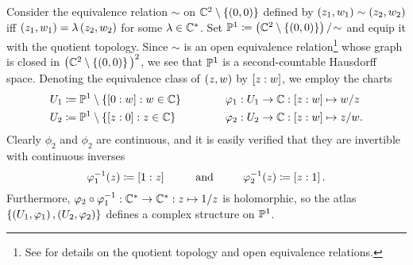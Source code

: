 \documentclass[../Moduli_Spaces_of_Riemann_Surfaces.tex]{subfiles}
\begin{document}
    \begin{example}\label{RS:exa:complex_projective_line}
        Consider the equivalence relation $\sim$ on $\C^2\comp\l\{\tpl{0,0}\r\}$ defined by $\tpl{z_1,w_1}\sim\tpl{z_2,w_2}$ iff $\tpl{z_1,w_1}=\lambda\tpl{z_2,w_2}$ for some $\lambda\in\C^\ast$. Set $\P^1\coloneqq\l(\C^2\comp\l\{\tpl{0,0}\r\}\r)/\!\sim$ and equip it with the quotient topology. Since $\sim$ is an open equivalence relation\footnote{See \cite[][Section 7.5]{tu} for details on the quotient topology and open equivalence relations.} whose graph is closed in $\big(\C^2\comp\l\{\tpl{0,0}\r\}\big)^2$, we see that $\P^1$ is a second-countable Hausdorff space. Denoting the equivalence class of $\tpl{z,w}$ by $\proje{z:w}$, we employ the charts
        \begin{equation*}
            \begin{alignedat}{2}
                U_1&\coloneqq\P^1\comp\l\{\proje{0:w}\st w\in\C\r\}\ \ \ \ \ \ \ \ \ \ \ \ &&\phi_1:U_1\to\C:\proje{z:w}\mapsto w/z \\
                U_2&\coloneqq\P^1\comp\l\{\proje{z:0}\st z\in\C\r\}&&\phi_2:U_2\to\C:\proje{z:w}\mapsto z/w.
            \end{alignedat}
        \end{equation*}
        Clearly $\phi_2$ and $\phi_2$ are continuous, and it is easily verified that they are invertible with continuous inverses
        \begin{equation*}
            \phi_1^{-1}\!\l(z\r)\coloneqq\proje{1:z}\ \ \ \ \ \ \ \ \textrm{and}\ \ \ \ \ \ \ \ \phi_2^{-1}\!\l(z\r)\coloneqq\proje{z:1}.
        \end{equation*}
        Furthermore, $\phi_2\circ\phi_1^{-1}:\C^\ast\to\C^\ast:z\mapsto1/z$ is holomorphic, so the atlas $\l\{\tpl{U_1,\phi_1},\tpl{U_2,\phi_2}\r\}$ defines a complex structure on $\P^1$.\exqed
    \end{example}
\end{document}
